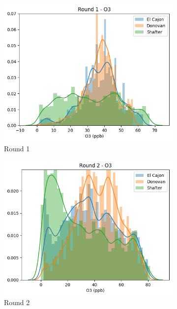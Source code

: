 \documentclass[journal abbreviation, manuscript]{copernicus}
\begin{document}
\begin{figure}[H]
\centering
\begin{subfigure}{0.32\textwidth}
\includegraphics[width=\textwidth]{results/distributions/round1_o3.png}
\caption{Round 1}
\end{subfigure}
\begin{subfigure}{0.32\textwidth}
\includegraphics[width=\textwidth]{results/distributions/round2_o3.png}
\caption{Round 2}
\end{subfigure}
\begin{subfigure}{0.32\textwidth}

\end{subfigure}
\end{figure}
\end{document}
